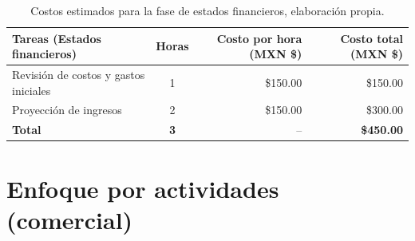 \begin{table}[H]
	\centering
	\renewcommand{\arraystretch}{1.6}
	\setlength{\tabcolsep}{10pt}
	\Huge
	\begin{adjustbox}{max width=\textwidth}
		\begin{tabular}{|p{9.5cm}|c|r|r|}
			\hline
			\textbf{Tareas (Estados financieros)} & \textbf{Horas} & \textbf{Costo por hora (MXN \$)} & \textbf{Costo total (MXN \$)} \\ \hline
			Revisión de costos y gastos iniciales & 1 & \$150.00 & \$150.00 \\ \hline
			Proyección de ingresos & 2 & \$150.00 & \$300.00 \\ \hline
			\textbf{Total} & \textbf{3} & -- & \textbf{\$450.00} \\ \hline
		\end{tabular}
	\end{adjustbox}
	\caption[Costos estimados para la fase de estados financieros]{Costos estimados para la fase de estados financieros, elaboración propia.} 	
	\label{tab:costos_estados_financieros}
\end{table}

\chapter[Anexo C. Enfoque por actividades (comercial)]{Enfoque por actividades (comercial)}
\label{anexo:actividades_comercial}  %

